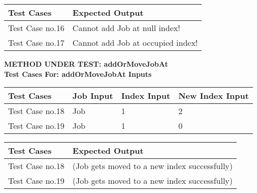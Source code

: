 \documentclass[12pt]{report}
\begin{document}
	\begin{flushleft}
		\begin{tabular}{ | l | l | }
			\hline
			Test Cases & Expected Output \\ \hline
			Test Case no.16 & Cannot add Job at null index! \\ \hline
			Test Case no.17 & Cannot add Job at occupied index! \\ \hline
		\end{tabular}
	\end{flushleft}

	\textbf{METHOD UNDER TEST: addOrMoveJobAt} \\
	\textbf{Test Cases For: addOrMoveJobAt Inputs}
	\begin{flushleft}
		\begin{tabular}{ | l | l | l | l | }
			\hline
			Test Cases & Job Input & Index Input & New Index Input \\ \hline
			Test Case no.18 & Job & 1 & 2 \\ \hline
			Test Case no.19 & Job & 1 & 0 \\ \hline
		\end{tabular}
	\end{flushleft}
	
	\begin{flushleft}
		\begin{tabular}{ | l | l | }
			\hline
			Test Cases & Expected Output \\ \hline
			Test Case no.18 & (Job gets moved to a new index successfully) \\ \hline
			Test Case no.19 & (Job gets moved to a new index successfully) \\ \hline
		\end{tabular}
	\end{flushleft}
\newpage
\end{document}
